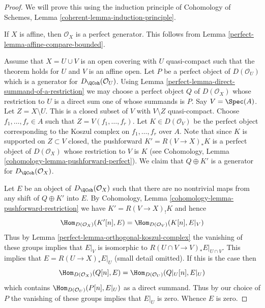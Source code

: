 \begin{proof}

We will prove this using the induction principle of
Cohomology of Schemes, Lemma \ref{coherent-lemma-induction-principle}.

\medskip\noindent
If $X$ is affine, then $\mathcal{O}_X$ is a perfect generator.
This follows from Lemma \ref{perfect-lemma-affine-compare-bounded}.

\medskip\noindent
Assume that $X = U \cup V$ is an open covering with $U$ quasi-compact
such that the theorem holds for $U$ and $V$ is an affine open.
Let $P$ be a perfect object of $D(\mathcal{O}_U)$ which is a generator
for $D_\QCoh(\mathcal{O}_U)$. Using
Lemma \ref{perfect-lemma-direct-summand-of-a-restriction} we may
choose a perfect object
$Q$ of $D(\mathcal{O}_X)$ whose restriction to $U$ is a direct sum one
of whose summands is $P$. Say $V = \Spec(A)$. Let $Z = X \setminus U$.
This is a closed subset of $V$ with $V \setminus Z$ quasi-compact.
Choose $f_1, \ldots, f_r \in A$ such that
$Z = V(f_1, \ldots, f_r)$. Let $K \in D(\mathcal{O}_V)$ be the perfect
object corresponding to the Koszul complex on $f_1, \ldots, f_r$ over $A$.
Note that since $K$ is supported on $Z \subset V$ closed, the pushforward
$K' = R(V \to X)_*K$ is a perfect object of $D(\mathcal{O}_X)$ whose
restriction to $V$ is $K$ (see
Cohomology, Lemma \ref{cohomology-lemma-pushforward-perfect}).
We claim that $Q \oplus K'$ is a generator for
$D_\QCoh(\mathcal{O}_X)$.

\medskip\noindent
Let $E$ be an object of $D_\QCoh(\mathcal{O}_X)$ such that
there are no nontrivial maps from any shift of $Q \oplus K'$ into $E$.
By Cohomology, Lemma \ref{cohomology-lemma-pushforward-restriction}
we have $K' =  R(V \to X)_! K$ and hence
$$
\Hom_{D(\mathcal{O}_X)}(K'[n], E) = \Hom_{D(\mathcal{O}_V)}(K[n], E|_V)
$$
Thus by Lemma \ref{perfect-lemma-orthogonal-koszul-complex} the vanishing of
these groups implies that $E|_V$ is isomorphic to
$R(U \cap V \to V)_*E|_{U \cap V}$. This implies that $E = R(U \to X)_*E|_U$
(small detail omitted). If this is the case then
$$
\Hom_{D(\mathcal{O}_X)}(Q[n], E) = \Hom_{D(\mathcal{O}_U)}(Q|_U[n], E|_U)
$$
which contains $\Hom_{D(\mathcal{O}_U)}(P[n], E|_U)$ as a direct summand.
Thus by our choice of $P$ the vanishing of these groups implies that $E|_U$
is zero. Whence $E$ is zero.
\end{proof}

